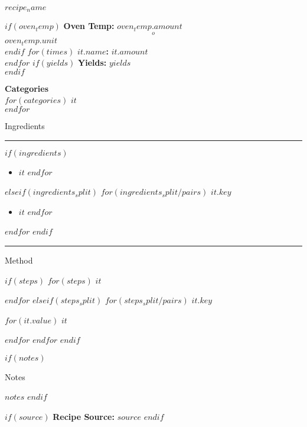 \documentclass{scrartcl}
\begin{document}
\begin{center}
{\huge $recipe_name$}
\end{center}

\vspace{1cm}

\begin{minipage}[t]{3in}
  $if(oven_temp)$
    \textbf{Oven Temp:} $oven_temp.amount$$$^o$$$oven_temp.unit$\\
  $endif$
  $for(times)$
    \textbf{$it.name$:} $it.amount$\\
  $endfor$
  $if(yields)$
    \textbf{Yields:} $yields$\\
  $endif$
\end{minipage}
\hfill
\begin{minipage}[t]{3in}
  \begin{flushright}
  \textbf{{\large Categories}}\\
  $for(categories)$
    $it$\\
  $endfor$
  \end{flushright}
\end{minipage}


\bigskip

\begin{center}
{\Large Ingredients}
\end{center}
\hrule

$if(ingredients)$
  \begin{multicols}{2}
    \begin{itemize}
      $for(ingredients)$
        \item $it$
      $endfor$
    \end{itemize}
  \end{multicols}
$elseif(ingredients_split)$
  $for(ingredients_split/pairs)$
  \textbf{\large $it.key$}
    \begin{multicols}{2}
      \begin{itemize}
        $for(it.value)$
          \item $it$
        $endfor$
      \end{itemize}
    \end{multicols}
  $endfor$
$endif$

\hrule
\medskip

\begin{center}
{\Large Method}
\end{center}

$if(steps)$
  $for(steps)$
  $it$

  \medskip
  $endfor$
$elseif(steps_split)$
  $for(steps_split/pairs)$
    \textbf{\large $it.key$}

    \medskip
    $for(it.value)$
      $it$

      \medskip
    $endfor$
  $endfor$
$endif$

$if(notes)$
  \begin{center}
  {\Large Notes}
  \end{center}
  $notes$
$endif$

$if(source)$
  \vfill
  \textbf{Recipe Source:} $source$
$endif$
\end{document}

